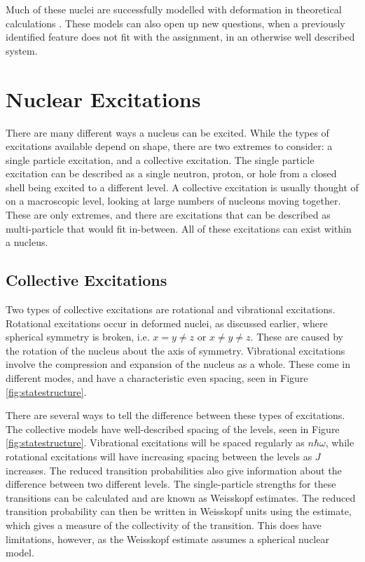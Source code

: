 

Much of these nuclei are successfully modelled with deformation in theoretical calculations \citep{delaroche10:_systematics}. These models can also open up new questions, when a previously identified feature does not fit with the assignment, in an otherwise well described system.

\section{Nuclear Excitations}
\label{sec:nuc_excite}

There are many different ways a nucleus can be excited. While the types of excitations available depend on shape, there are two extremes to consider: a single particle excitation, and a collective excitation. The single particle excitation can be described as a single neutron, proton, or hole from a closed shell being excited to a different level. A collective excitation is usually thought of on a macroscopic level, looking at large numbers of nucleons moving together. These are only extremes, and there are excitations that can be described as multi-particle that would fit in-between. All of these excitations can exist within a nucleus.

\subsection{Collective Excitations}

Two types of collective excitations are rotational and vibrational excitations. Rotational excitations occur in deformed nuclei, as discussed earlier, where spherical symmetry is broken, i.e. $x=y\neq z$ or $x \neq y \neq z$. These are caused by the rotation of the nucleus about the axis of symmetry. Vibrational excitations involve the compression and expansion of the nucleus as a whole. These come in different modes, and have a characteristic even spacing, seen in Figure \ref{fig:statestructure}.



There are several ways to tell the difference between these types of excitations. The collective models have well-described spacing of the levels, seen in Figure \ref{fig:statestructure}. Vibrational excitations will be spaced regularly as $n\hbar\omega$, while rotational excitations will have increasing spacing between the levels as $J$ increases. The reduced transition probabilities also give information about the difference between two different levels. The single-particle strengths for these transitions can be calculated and are known as Weisskopf estimates. The reduced transition probability can then be written in Weisskopf units using the estimate, which gives a measure of the collectivity of the transition. This does have limitations, however, as the Weisskopf estimate assumes a spherical nuclear model.

